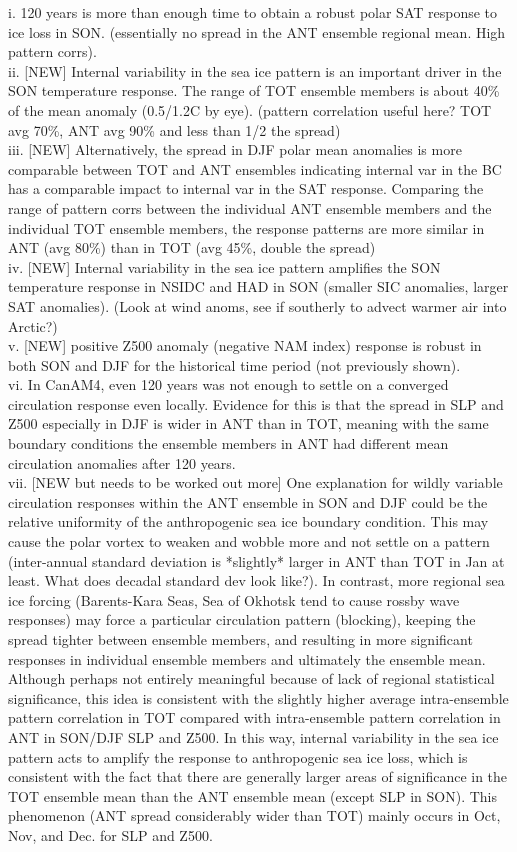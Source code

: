 \documentclass[twocol]{ametsoc}
\begin{document}
i. 120 years is more than enough time to obtain a robust polar SAT response to ice loss in SON. (essentially no spread in the ANT ensemble regional mean. High pattern corrs). \\
ii. [NEW] Internal variability in the sea ice pattern is an important driver in the SON temperature response. The range of TOT ensemble members is about 40\% of the mean anomaly (0.5/1.2C by eye). (pattern correlation useful here? TOT avg 70\%, ANT avg 90\% and less than 1/2 the spread)\\
iii. [NEW] Alternatively, the spread in DJF polar mean anomalies is more comparable between TOT and ANT ensembles indicating internal var in the BC has a comparable impact to internal var in the SAT response. Comparing the range of pattern corrs between the individual ANT ensemble members and the individual TOT ensemble members, the response patterns are more similar in ANT (avg 80\%) than in TOT (avg 45\%, double the spread) \\
iv. [NEW] Internal variability in the sea ice pattern amplifies the SON temperature response in NSIDC and HAD in SON (smaller SIC anomalies, larger SAT anomalies). (Look at wind anoms, see if southerly to advect warmer air into Arctic?)\\
v. [NEW] positive Z500 anomaly (negative NAM index) response is robust in both SON and DJF for the historical time period (not previously shown).\\
vi. In CanAM4, even 120 years was not enough to settle on a converged circulation response even locally. Evidence for this is that the spread in SLP and Z500 especially in DJF is wider in ANT than in TOT, meaning with the same boundary conditions the ensemble members in ANT had different mean circulation anomalies after 120 years.\\
vii. [NEW but needs to be worked out more] One explanation for wildly variable circulation responses within the ANT ensemble in SON and DJF could be the relative uniformity of the anthropogenic sea ice boundary condition. This may cause the polar vortex to weaken and wobble more and not settle on a pattern (inter-annual standard deviation is *slightly* larger in ANT than TOT in Jan at least. What does decadal standard dev look like?). In contrast, more regional sea ice forcing (Barents-Kara Seas, Sea of Okhotsk tend to cause rossby wave responses) may force a particular circulation pattern (blocking), keeping the spread tighter between ensemble members, and resulting in more significant responses in individual ensemble members and ultimately the ensemble mean. Although perhaps not entirely meaningful because of lack of regional statistical significance, this idea is consistent with the slightly higher average intra-ensemble pattern correlation in TOT compared with intra-ensemble pattern correlation in ANT in SON/DJF SLP and Z500. In this way, internal variability in the sea ice pattern acts to amplify the response to anthropogenic sea ice loss, which is consistent with the fact that there are generally larger areas of significance in the TOT ensemble mean than the ANT ensemble mean (except SLP in SON). This phenomenon (ANT spread considerably wider than TOT) mainly occurs in Oct, Nov, and Dec. for SLP and Z500. \\
\end{document}
